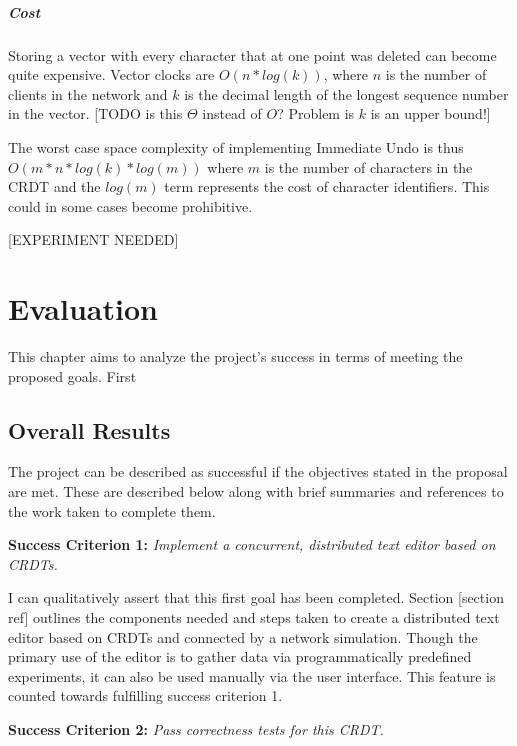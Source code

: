 \documentclass[12pt,a4paper,twoside,openright]{report}
\begin{document}
			\paragraph{Cost}
			Storing a vector with every character that at one point was deleted can become quite expensive. Vector clocks are $O(n*log(k))$, where $n$ is the number of clients in the network and $k$ is the decimal length of the longest sequence number in the vector.
			[TODO is this $\Theta$ instead of $O$? Problem is $k$ is an upper bound!]
			
			The worst case space complexity of implementing Immediate Undo is thus $O(m*n*log(k)*log(m))$ where $m$ is the number of characters in the CRDT and the $log(m)$ term represents the cost of character identifiers. This could in some cases become prohibitive.
			
			[EXPERIMENT NEEDED]
			
			
			
			
		


\chapter{Evaluation}
	This chapter aims to analyze the project's success in terms of meeting the proposed goals. First

	\section{Overall Results}
	
	The project can be described as successful if the objectives stated in the proposal are met. These are described below along with brief summaries and references to the work taken to complete them.
	
	\textbf{Success Criterion 1:} \textit{Implement a concurrent, distributed text editor based on CRDTs.}
	
	I can qualitatively assert that this first goal has been completed. Section [section ref] outlines the components needed and steps taken to create a distributed text editor based on CRDTs and connected by a network simulation. Though the primary use of the editor is to gather data via programmatically predefined experiments, it can also be used manually via the user interface. This feature is counted towards fulfilling success criterion 1.
	
	\textbf{Success Criterion 2:} \textit{Pass correctness tests for this CRDT.}
	
\end{document}
